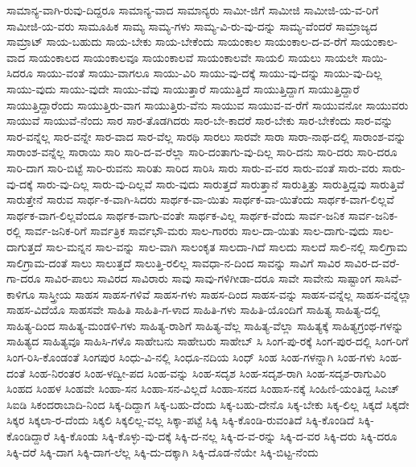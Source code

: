 {ಸಾಮಾನ್ಯ-ವಾಗಿ-ರುವು-ದಿದ್ದರೂ
ಸಾಮಾನ್ಯ-ವಾದ
ಸಾಮಾನ್ಯರು
ಸಾಮೀ-ಜಿಗೆ
ಸಾಮೀಜಿ
ಸಾಮೀಜಿ-ಯ-ವ-ರಿಗೆ
ಸಾಮೀಜಿ-ಯ-ವರು
ಸಾಮೂಹಿಕ
ಸಾಮ್ಯ
ಸಾಮ್ಯ-ಗಳು
ಸಾಮ್ಯ-ವಿ-ರು-ವು-ದನ್ನು
ಸಾಮ್ಯ-ವೆಂದರೆ
ಸಾಮ್ರಾಜ್ಯದ
ಸಾಮ್ರಾಟ್
ಸಾಯ-ಬಹುದು
ಸಾಯ-ಬೇಕು
ಸಾಯ-ಬೇಕೆಂದು
ಸಾಯಂಕಾಲ
ಸಾಯಂಕಾಲ-ದ-ವ-ರೆಗೆ
ಸಾಯಂಕಾಲ-ವಾದ
ಸಾಯಂಕಾಲದ
ಸಾಯಂಕಾಲವೂ
ಸಾಯಂಕಾಲವೆ
ಸಾಯಂಕಾಲವೇ
ಸಾಯಲಿ
ಸಾಯಲು
ಸಾಯಲೇ
ಸಾಯಿ-ಸಿದರೂ
ಸಾಯು-ವಂತೆ
ಸಾಯು-ವಾಗಲೂ
ಸಾಯು-ವಿರಿ
ಸಾಯು-ವು-ದಕ್ಕೆ
ಸಾಯು-ವು-ದನ್ನು
ಸಾಯು-ವು-ದಿಲ್ಲ
ಸಾಯು-ವುದು
ಸಾಯು-ವುದೇ
ಸಾಯು-ವೆವು
ಸಾಯುತ್ತಾರೆ
ಸಾಯುತ್ತಿದೆ
ಸಾಯುತ್ತಿದ್ದಾಗ
ಸಾಯುತ್ತಿದ್ದಾರೆ
ಸಾಯುತ್ತಿದ್ದಾರೆಂದು
ಸಾಯುತ್ತಿರು-ವಾಗ
ಸಾಯುತ್ತಿರು-ವೆನು
ಸಾಯುವ
ಸಾಯುವ-ವ-ರೆಗೆ
ಸಾಯುವನೋ
ಸಾಯುವರು
ಸಾಯುವೆ
ಸಾಯುವೆ-ನೆಂದು
ಸಾರ
ಸಾರ-ತೊಡಗಿದರು
ಸಾರ-ಬೇ-ಕಾದರೆ
ಸಾರ-ಬೇಕು
ಸಾರ-ಬೇಕೆಂದು
ಸಾರ-ವನ್ನು
ಸಾರ-ವನ್ನೆಲ್ಲ
ಸಾರ-ವನ್ನೇ
ಸಾರ-ವಾದ
ಸಾರ-ವೆಲ್ಲ
ಸಾರಥಿ
ಸಾರಲು
ಸಾರವೇ
ಸಾರಾ
ಸಾರಾ-ನಾಥ-ದಲ್ಲಿ
ಸಾರಾಂಶ-ವನ್ನು
ಸಾರಾಂಶ-ವನ್ನೆಲ್ಲ
ಸಾರಾಯಿ
ಸಾರಿ
ಸಾರಿ-ದ-ವ-ರೆಲ್ಲಾ
ಸಾರಿ-ದಂತಾಗು-ವು-ದಿಲ್ಲ
ಸಾರಿ-ದನು
ಸಾರಿ-ದರು
ಸಾರಿ-ದರೂ
ಸಾರಿ-ದಾಗ
ಸಾರಿ-ಬಿಟ್ಟೆ
ಸಾರಿ-ರುವನು
ಸಾರಿತು
ಸಾರಿದ
ಸಾರಿಸಿ
ಸಾರು
ಸಾರು-ವ-ವರ
ಸಾರು-ವಂತೆ
ಸಾರು-ವರು
ಸಾರು-ವು-ದಕ್ಕೆ
ಸಾರು-ವು-ದಿಲ್ಲ
ಸಾರು-ವು-ದಿಲ್ಲವೆ
ಸಾರು-ವುದು
ಸಾರುತ್ತದೆ
ಸಾರುತ್ತಾನೆ
ಸಾರುತ್ತಿತ್ತು
ಸಾರುತ್ತಿದ್ದವು
ಸಾರುತ್ತಿವೆ
ಸಾರುತ್ತೇನೆ
ಸಾರುವ
ಸಾರ್ಥ-ಕ-ವಾಗಿ-ಸಿದರು
ಸಾರ್ಥಕ-ವಾ-ಯಿತು
ಸಾರ್ಥಕ-ವಾ-ಯಿತೆಂದು
ಸಾರ್ಥಕ-ವಾಗ-ಲಿಲ್ಲವೆ
ಸಾರ್ಥಕ-ವಾಗ-ಲಿಲ್ಲವೆಂದೂ
ಸಾರ್ಥಕ-ವಾಗು-ವಂತೇ
ಸಾರ್ಥಕ-ವಿಲ್ಲ
ಸಾರ್ಥಕ-ವೆಂದು
ಸಾರ್ವ-ಜನಿಕ
ಸಾರ್ವ-ಜನಿಕ-ರಲ್ಲಿ
ಸಾರ್ವ-ಜನಿಕ-ರಿಗೆ
ಸಾರ್ವತ್ರಿಕ
ಸಾರ್ವಭೌ-ಮರು
ಸಾಲ-ಗಾರರು
ಸಾಲ-ದಾ-ಯಿತು
ಸಾಲ-ದಾಗು-ವುದು
ಸಾಲ-ದಾಗುತ್ತದೆ
ಸಾಲ-ಮನ್ನನ
ಸಾಲ-ವನ್ನು
ಸಾಲ-ವಾಗಿ
ಸಾಲಂಕೃತ
ಸಾಲದಾ-ಗಿದೆ
ಸಾಲದು
ಸಾಲದೆ
ಸಾಲಿ-ನಲ್ಲಿ
ಸಾಲಿಗ್ರಾಮ
ಸಾಲಿಗ್ರಾಮ-ದಂತೆ
ಸಾಲು
ಸಾಲುತ್ತದೆ
ಸಾಲುತ್ತಿ-ರಲಿಲ್ಲ
ಸಾವಧಾ-ನ-ದಿಂದ
ಸಾವನ್ನು
ಸಾವಿಗೆ
ಸಾವಿರ
ಸಾವಿರ-ದ-ವರೆ-ಗಾ-ದರೂ
ಸಾವಿರ-ಪಾಲು
ಸಾವಿರದ
ಸಾವಿರಾರು
ಸಾವು
ಸಾವು-ಗಳಿಗೀಡಾ-ದರೂ
ಸಾವೇ
ಸಾವೇನು
ಸಾಷ್ಟಾಂಗ
ಸಾಸಿವೆ-ಕಾಳಿಗೂ
ಸಾಸ್ತ್ರೀಯ
ಸಾಹಸ
ಸಾಹಸ-ಗಳಿವೆ
ಸಾಹಸ-ಗಳು
ಸಾಹಸ-ದಿಂದ
ಸಾಹಸ-ವನ್ನು
ಸಾಹಸ-ವನ್ನೆಲ್ಲ
ಸಾಹಸ-ವನ್ನೆಲ್ಲಾ
ಸಾಹಸ-ವಿದೆಯೊ
ಸಾಹಸವೇ
ಸಾಹಿತಿ
ಸಾಹಿತಿ-ಗ-ಳಾದ
ಸಾಹಿತಿ-ಗಳು
ಸಾಹಿತಿ-ಯೊಂದಿಗೆ
ಸಾಹಿತ್ಯ
ಸಾಹಿತ್ಯ-ದಲ್ಲಿ
ಸಾಹಿತ್ಯ-ದಿಂದ
ಸಾಹಿತ್ಯ-ಮಂಡಳಿ-ಗಳು
ಸಾಹಿತ್ಯ-ರಾಶಿಗೆ
ಸಾಹಿತ್ಯ-ವೆಲ್ಲ
ಸಾಹಿತ್ಯ-ವೆಲ್ಲಾ
ಸಾಹಿತ್ಯಕ್ಕೆ
ಸಾಹಿತ್ಯಗ್ರಂಥ-ಗಳನ್ನು
ಸಾಹಿತ್ಯದ
ಸಾಹಿತ್ಯವೂ
ಸಾಹಿಸಿ-ಗಳೊ
ಸಾಹೇಬನು
ಸಾಹೇಬರು
ಸಾಹೇಬ್
ಸಿ
ಸಿಂಗ-ಪು-ರಕ್ಕೆ
ಸಿಂಗ-ಪುರ-ದಲ್ಲಿ
ಸಿಂಗ-ರಿಗೆ
ಸಿಂಗ-ರಿಸಿ-ಕೊಂಡಂತೆ
ಸಿಂಗಪುರ
ಸಿಂಧು-ವಿ-ನಲ್ಲಿ
ಸಿಂಧೂ-ನದಿಯ
ಸಿಂಧ್
ಸಿಂಹ
ಸಿಂಹ-ಗಳನ್ನಾಗಿ
ಸಿಂಹ-ಗಳು
ಸಿಂಹ-ದಂತೆ
ಸಿಂಹ-ನಿರಂತರ
ಸಿಂಹ-ಳದ್ವೀ-ಪದ
ಸಿಂಹ-ವನ್ನು
ಸಿಂಹ-ಸದೃಶ
ಸಿಂಹ-ಸದೃಶ-ರಾಗಿ
ಸಿಂಹ-ಸದೃಶ-ರಾಗುವಿರಿ
ಸಿಂಹದ
ಸಿಂಹಳ
ಸಿಂಹವೇ
ಸಿಂಹಾ-ಸನ
ಸಿಂಹಾ-ಸನ-ವಿಲ್ಲದೆ
ಸಿಂಹಾ-ಸನದ
ಸಿಂಹಾಸ-ನಕ್ಕೆ
ಸಿಂಹಿಣಿ-ಯಂತಿದ್ದ
ಸಿಎಚ್
ಸಿಐಡಿ
ಸಿಕಂದರಾಬಾದಿ-ನಿಂದ
ಸಿಕ್ಕ-ದಿದ್ದಾಗ
ಸಿಕ್ಕ-ಬಹು-ದೆಂದು
ಸಿಕ್ಕ-ಬಹು-ದೇನೊ
ಸಿಕ್ಕ-ಬೇಕು
ಸಿಕ್ಕ-ಲಿಲ್ಲ
ಸಿಕ್ಕದೆ
ಸಿಕ್ಕದೇ
ಸಿಕ್ಕರ
ಸಿಕ್ಕಲಾ-ರ-ದೆಂದು
ಸಿಕ್ಕಲಿ
ಸಿಕ್ಕಲಿಲ್ಲ-ವಲ್ಲ
ಸಿಕ್ಕಾ-ಪಟ್ಟೆ
ಸಿಕ್ಕಿ
ಸಿಕ್ಕಿ-ಕೊಂಡಿ-ರುವಂತಿದೆ
ಸಿಕ್ಕಿ-ಕೊಂಡಿದೆ
ಸಿಕ್ಕಿ-ಕೊಂಡಿದ್ದಾರೆ
ಸಿಕ್ಕಿ-ಕೊಂಡು
ಸಿಕ್ಕಿ-ಕೊಳ್ಳು-ವು-ದಕ್ಕೆ
ಸಿಕ್ಕಿ-ದ-ನಲ್ಲ
ಸಿಕ್ಕಿ-ದ-ವ-ರನ್ನು
ಸಿಕ್ಕಿ-ದ-ವರ
ಸಿಕ್ಕಿ-ದರು
ಸಿಕ್ಕಿ-ದರೂ
ಸಿಕ್ಕಿ-ದರೆ
ಸಿಕ್ಕಿ-ದಾಗ
ಸಿಕ್ಕಿ-ದಾಗ-ಲೆಲ್ಲ
ಸಿಕ್ಕಿ-ದು-ದಕ್ಕಾಗಿ
ಸಿಕ್ಕಿ-ದೊಡ-ನೆಯೇ
ಸಿಕ್ಕಿ-ಬಿಟ್ಟ-ನೆಂದು
}
